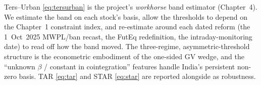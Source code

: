 \begin{takeaway}
Ters--Urban \eqref{eq:tersurban} is the project's \emph{workhorse} band estimator (Chapter~4). We estimate the band on each stock's basis, allow the thresholds to depend on the Chapter~1 constraint index, and re-estimate around each dated reform (the 1~Oct~2025 MWPL/ban recast, the FutEq redefinition, the intraday-monitoring date) to read off how the band moved. The three-regime, asymmetric-threshold structure is the econometric embodiment of the one-sided GV wedge, and the ``unknown $\beta$ / constant in cointegration'' features handle India's persistent non-zero basis. TAR \eqref{eq:tar} and STAR \eqref{eq:star} are reported alongside as robustness.
\end{takeaway}
